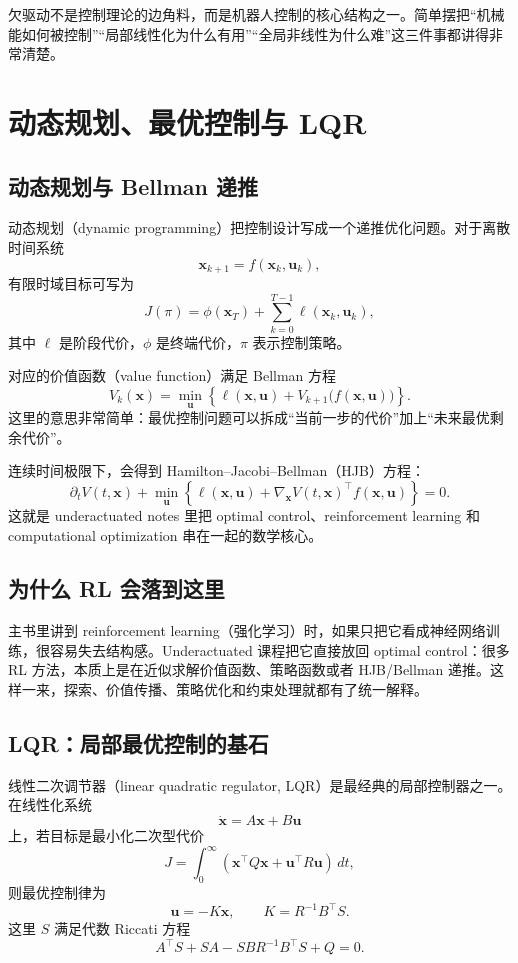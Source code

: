 \documentclass[a4paper]{article}
\newcommand{\bx}{\mathbf{x}}
\newcommand{\bu}{\mathbf{u}}
\begin{document}
欠驱动不是控制理论的边角料，而是机器人控制的核心结构之一。简单摆把“机械能如何被控制”“局部线性化为什么有用”“全局非线性为什么难”这三件事都讲得非常清楚。

\section{动态规划、最优控制与 LQR}

\subsection{动态规划与 Bellman 递推}

动态规划（dynamic programming）把控制设计写成一个递推优化问题。对于离散时间系统
\[
\bx_{k+1} = f(\bx_k,\bu_k),
\]
有限时域目标可写为
\[
J(\pi) = \phi(\bx_T) + \sum_{k=0}^{T-1} \ell(\bx_k,\bu_k),
\]
其中 $\ell$ 是阶段代价，$\phi$ 是终端代价，$\pi$ 表示控制策略。

对应的价值函数（value function）满足 Bellman 方程
\[
V_k(\bx) = \min_{\bu}\left\{\ell(\bx,\bu) + V_{k+1}\!\big(f(\bx,\bu)\big)\right\}.
\]
这里的意思非常简单：最优控制问题可以拆成“当前一步的代价”加上“未来最优剩余代价”。

连续时间极限下，会得到 Hamilton--Jacobi--Bellman（HJB）方程：
\[
\partial_t V(t,\bx) + \min_{\bu}\left\{\ell(\bx,\bu) + \nabla_{\bx}V(t,\bx)^\top f(\bx,\bu)\right\} = 0.
\]
这就是 underactuated notes 里把 optimal control、reinforcement learning 和 computational optimization 串在一起的数学核心。

\subsection{为什么 RL 会落到这里}

主书里讲到 reinforcement learning（强化学习）时，如果只把它看成神经网络训练，很容易失去结构感。Underactuated 课程把它直接放回 optimal control：很多 RL 方法，本质上是在近似求解价值函数、策略函数或者 HJB/Bellman 递推。这样一来，探索、价值传播、策略优化和约束处理就都有了统一解释。

\subsection{LQR：局部最优控制的基石}

线性二次调节器（linear quadratic regulator, LQR）是最经典的局部控制器之一。在线性化系统
\[
\dot{\bx} = A\bx + B\bu
\]
上，若目标是最小化二次型代价
\[
J = \int_0^\infty \left(\bx^\top Q \bx + \bu^\top R \bu\right)\,dt,
\]
则最优控制律为
\[
\bu = -K\bx,\qquad K = R^{-1}B^\top S.
\]
这里 $S$ 满足代数 Riccati 方程
\[
A^\top S + SA - SBR^{-1}B^\top S + Q = 0.
\]
\end{document}
